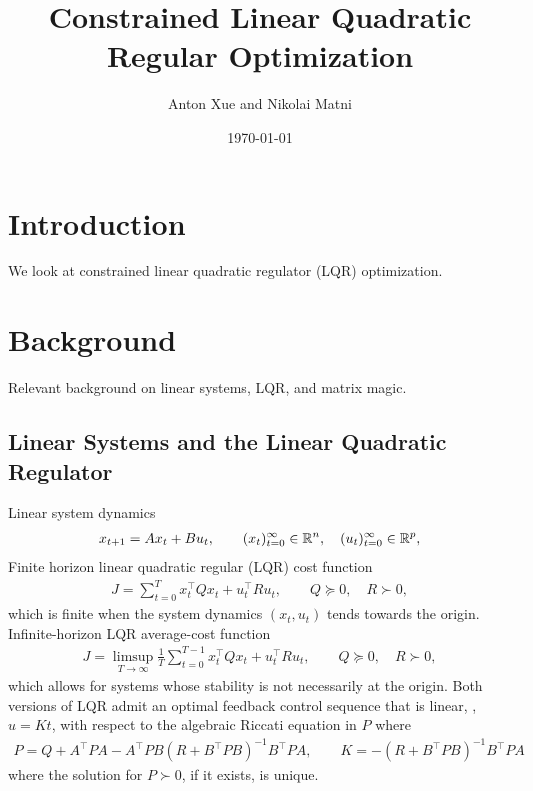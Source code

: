 \documentclass[12pt]{article}
\title{Constrained Linear Quadratic Regular Optimization}
\author{Anton Xue and Nikolai Matni}
\date{\today}
\date{}
\begin{document}
\maketitle

\section{Introduction}
We look at constrained linear quadratic regulator (LQR) optimization.

\section{Background}
Relevant background on linear systems, LQR, and matrix magic.

\subsection{Linear Systems and the Linear Quadratic Regulator}
Linear system dynamics
\begin{align*}
  x_{t + 1} = A x_t + B u_t,
    \qquad (x_t)_{t = 0}^{\infty} \in {\mathbb{R}}^n,
    \quad (u_t)_{t = 0}^{\infty} \in {\mathbb{R}}^p,
\end{align*}
Finite horizon linear quadratic regular (LQR) cost function
\begin{align*}
  J = \sum_{t = 0}^{T} x_t ^\top Q x_t + u_t ^\top R u_t,
    \qquad
    Q \succeq 0, \quad R \succ 0,
\end{align*}
which is finite when the system dynamics \((x_t, u_t)\)
tends towards the origin.
Infinite-horizon LQR average-cost function
\begin{align*}
  J = \limsup_{T \to \infty} \frac{1}{T} \sum_{t = 0}^{T - 1}
        x_t ^\top Q x_t + u_t ^\top R u_t,
    \qquad
    Q \succeq 0, \quad R \succ 0,
\end{align*}
which allows for systems whose stability is not necessarily at the origin.
Both versions of LQR admit an optimal feedback control sequence
that is linear, \ie, \(u = Kt\),
with respect to the algebraic Riccati equation in \(P\) where
\begin{align*}
  P = Q + A^\top P A - A^\top P B (R + B^\top P B)^{-1} B^\top P A,
    \qquad K = -(R + B^\top P B)^{-1} B^\top P A
\end{align*}
where the solution for \(P \succ 0\), if it exists, is unique.
\end{document}
